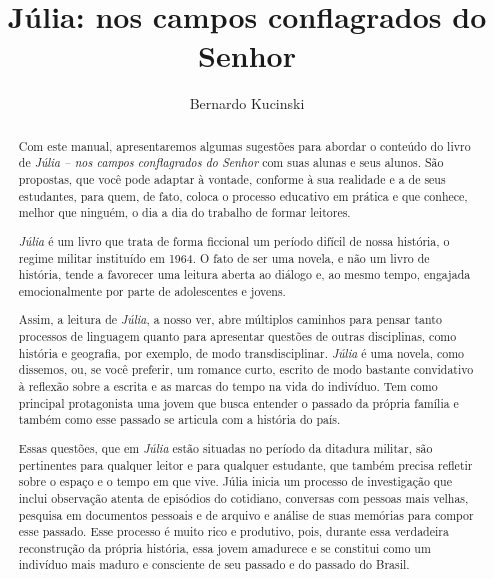 \documentclass[12pt]{extarticle}
\begin{document}
\newcommand{\AutorLivro}{Bernardo Kucinski}
\newcommand{\TituloLivro}{Júlia: nos campos conflagrados do Senhor}
\newcommand{\Tema}{Ficção, mistério e fantasia}
\newcommand{\Genero}{Romance}
\newcommand{\imagemCapa}{./images/PNLD0053-01.png}
\newcommand{\issnppub}{978-65-5966-013-1}
\newcommand{\issnepub}{978-65-5966-014-8}
\newcommand{\colaborador}{{Haroldo Ceravolo}}


\title{\TituloLivro}
\author{\AutorLivro}
\def\authornotes{\colaborador}

\date{}
\maketitle

\begin{abstract}

Com este manual, apresentaremos algumas sugestões para abordar o
conteúdo do livro de \emph{Júlia -- nos campos conflagrados do Senhor}
com suas alunas e seus alunos. São propostas, que você pode adaptar à
vontade, conforme à sua realidade e a de seus estudantes, para quem, de
fato, coloca o processo educativo em prática e que conhece, melhor que
ninguém, o dia a dia do trabalho de formar leitores.

\emph{Júlia} é um livro que trata de forma ficcional um período difícil
de nossa história, o regime militar instituído em 1964. O fato de ser
uma novela, e não um livro de história, tende a favorecer uma leitura
aberta ao diálogo e, ao mesmo tempo, engajada emocionalmente por parte
de adolescentes e jovens.

Assim, a leitura de \emph{Júlia}, a nosso ver, abre múltiplos caminhos
para pensar tanto processos de linguagem quanto para apresentar questões
de outras disciplinas, como história e geografia, por exemplo, de modo
transdisciplinar. \emph{Júlia} é uma novela, como dissemos, ou, se você
preferir, um romance curto, escrito de modo bastante convidativo à
reflexão sobre a escrita e as marcas do tempo na vida do indivíduo. Tem
como principal protagonista uma jovem que busca entender o passado da
própria família e também como esse passado se articula com a história do
país.

Essas questões, que em \emph{Júlia} estão situadas no período da
ditadura militar, são pertinentes para qualquer leitor e para qualquer
estudante, que também precisa refletir sobre o espaço e o tempo em que
vive. Júlia inicia um processo de investigação que inclui observação
atenta de episódios do cotidiano, conversas com pessoas mais velhas,
pesquisa em documentos pessoais e de arquivo e análise de suas memórias
para compor esse passado. Esse processo é muito rico e produtivo, pois,
durante essa verdadeira reconstrução da própria história, essa jovem
amadurece e se constitui como um indivíduo mais maduro e consciente de
seu passado e do passado do Brasil.


\end{abstract}
\end{document}
